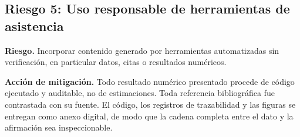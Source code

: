 \subsection{Riesgo 5: Uso responsable de herramientas de asistencia}

\textbf{Riesgo.} Incorporar contenido generado por herramientas automatizadas
sin verificación, en particular datos, citas o resultados numéricos.

\textbf{Acción de mitigación.} Todo resultado numérico presentado procede de
código ejecutado y auditable, no de estimaciones. Toda referencia bibliográfica
fue contrastada con su fuente. El código, los registros de trazabilidad y las
figuras se entregan como anexo digital, de modo que la cadena completa entre el
dato y la afirmación sea inspeccionable.
